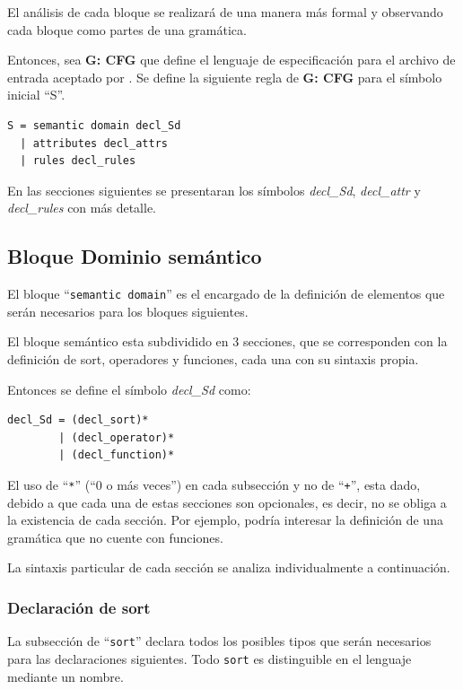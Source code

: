 El análisis de cada bloque se realizará de una manera más formal y observando cada bloque como partes de una gramática.

Entonces, sea \textbf{G: CFG} que define el lenguaje de especificación para el archivo de entrada aceptado por \maggen. Se define la siguiente regla de \textbf{G: CFG} para el símbolo inicial ``S''.

\vspace{0.3cm}
\begin{lstlisting}[frame=shadowbox, rulesepcolor=\color{azul},language=specmag, linewidth=10cm ]
S = semantic domain decl_Sd
  | attributes decl_attrs
  | rules decl_rules
\end{lstlisting}
\vspace{0.3cm}

En las secciones siguientes se presentaran los símbolos \textit{decl\_Sd}, \textit{decl\_attr} y \textit{decl\_rules} con más detalle.  

\subsection{Bloque Dominio semántico}

El bloque ``\texttt{semantic domain}'' es el encargado de la definición de elementos que serán necesarios para los bloques siguientes. 

El bloque semántico esta subdividido en 3 secciones, que se corresponden con la definición de sort, operadores y funciones, cada una con su sintaxis propia. 

Entonces se define el símbolo \textit{decl\_Sd} como:

\vspace{0.3cm}
\begin{lstlisting}[frame=shadowbox, rulesepcolor=\color{azul},language=inform,linewidth=10cm]
decl_Sd = (decl_sort)*
        | (decl_operator)*
        | (decl_function)*
\end{lstlisting}
\vspace{0.3cm}

El uso de ``\texttt{*}'' (``0 o más veces'') en cada subsección y no de ``\texttt{+}'', esta dado, debido a que cada una de estas secciones son opcionales, es decir, no se obliga a la existencia de cada sección. Por ejemplo, podría interesar la definición de una gramática que no cuente con funciones.

La sintaxis particular de cada sección se analiza individualmente a continuación.

\subsubsection{Declaración de sort}
La subsección de ``\texttt{sort}'' declara todos los posibles tipos que serán necesarios para las declaraciones siguientes. Todo \texttt{sort} es distinguible en el lenguaje mediante un nombre.

